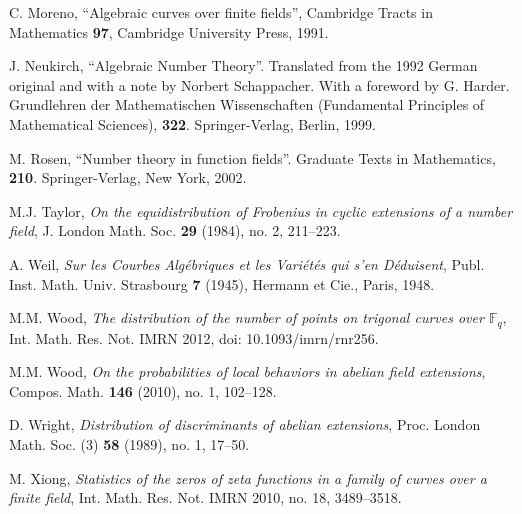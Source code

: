 \documentclass[12pt]{amsart}
\theoremstyle{plain}
\begin{document}
\begin{thebibliography}{99}
 C. Moreno, ``Algebraic curves over finite fields'', Cambridge Tracts in Mathematics {\bf 97}, Cambridge University Press, 1991.

 J. Neukirch, ``Algebraic Number Theory''. Translated from the 1992 German original and with a note by Norbert Schappacher. With a foreword by G. Harder. Grundlehren der Mathematischen Wissenschaften (Fundamental Principles of Mathematical Sciences), {\bf 322}. Springer-Verlag, Berlin, 1999.

 M. Rosen, ``Number theory in function fields''. Graduate Texts in Mathematics, {\bf 210}. Springer-Verlag, New York, 2002.

 M.J. Taylor, \emph{On the equidistribution of Frobenius in cyclic extensions of a number field}, J. London Math. Soc. {\bf 29} (1984), no. 2, 211--223.

 A. Weil, \emph{Sur les Courbes Alg\'ebriques et les Vari\'et\'es qui s'en D\'eduisent}, Publ. Inst. Math. Univ. Strasbourg {\bf 7} (1945),  Hermann et Cie., Paris, 1948.

 M.M. Wood, \emph{The distribution of the number of points on trigonal curves over ${{\mathbb F}_q}$}, Int. Math. Res. Not. IMRN 2012, doi: 10.1093/imrn/rnr256.

 M.M. Wood, \emph{On the probabilities of local behaviors in abelian field extensions}, Compos. Math. {\bf 146} (2010), no. 1, 102--128.

 D. Wright, \emph{Distribution of discriminants of abelian extensions}, Proc. London Math. Soc. (3) {\bf 58} (1989), no. 1, 17--50.

 M. Xiong, \emph{Statistics of the zeros of zeta functions in a family of curves over a finite field}, Int. Math. Res. Not. IMRN 2010, no. 18, 3489--3518.
\end{thebibliography}
\end{document}
